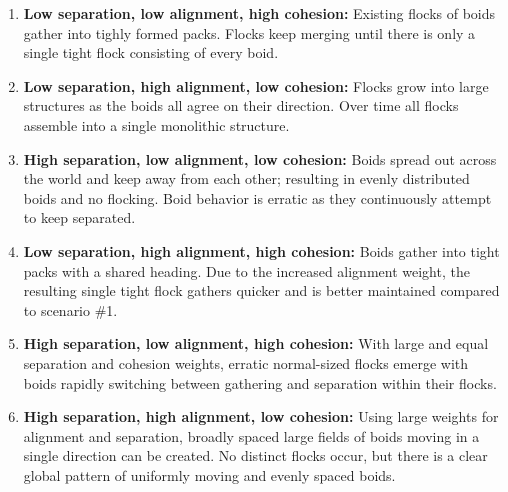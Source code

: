 \begin{enumerate}
\item \textbf{Low separation, low alignment, high cohesion:} Existing flocks of boids gather into tighly formed packs. Flocks keep merging until there is only a single tight flock consisting of every boid.
\item \textbf{Low separation, high alignment, low cohesion:} Flocks grow into large structures as the boids all agree on their direction. Over time all flocks assemble into a single monolithic structure.
\item \textbf{High separation, low alignment, low cohesion:} Boids spread out across the world and keep away from each other; resulting in evenly distributed boids and no flocking. Boid behavior is erratic as they continuously attempt to keep separated.
\item \textbf{Low separation, high alignment, high cohesion:} Boids gather into tight packs with a shared heading. Due to the increased alignment weight, the resulting single tight flock gathers quicker and is better maintained compared to scenario \#1.
\item \textbf{High separation, low alignment, high cohesion:} With large and equal separation and cohesion weights, erratic normal-sized flocks emerge with boids rapidly switching between gathering and separation within their flocks.
\item \textbf{High separation, high alignment, low cohesion:} Using large weights for alignment and separation, broadly spaced large fields of boids moving in a single direction can be created. No distinct flocks occur, but there is a clear global pattern of uniformly moving and evenly spaced boids.
\end{enumerate}



